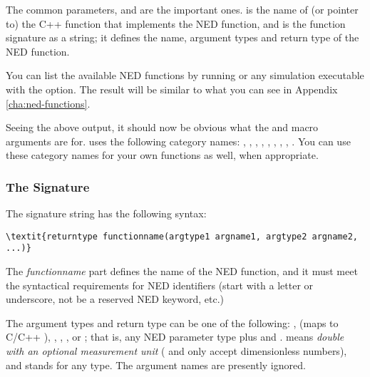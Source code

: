 The common parameters,  and  are the important
ones.  is the name of (or pointer to) the C++ function that
implements the NED function, and  is the function signature
as a string; it defines the name, argument types and return type of the NED
function.

You can list the available NED functions by running  or
any simulation executable with the  option.
The result will be similar to what you can see in Appendix
\ref{cha:ned-functions}.


Seeing the above output, it should now be obvious what the 
and  macro arguments are for. {\opp} uses the following
category names: , , ,
, , ,
, , . You can use these category names
for your own functions as well, when appropriate.


\subsubsection{The Signature}
\label{sec:sim-lib:ned-function-signature}

The signature string has the following syntax:

\begin{Verbatim}[commandchars=\\\{\}]
\textit{returntype functionname(argtype1 argname1, argtype2 argname2, ...)}
\end{Verbatim}

The \textit{functionname} part defines the name of the NED function, and it
must meet the syntactical requirements for NED identifiers (start with a
letter or underscore, not be a reserved NED keyword, etc.)

The argument types and return type can be one of the following:
,  (maps to C/C++ ),
, , , 
or ; that is, any NED parameter type plus 
and .  means \textit{double with an
optional measurement unit} ( and  only
accept dimensionless numbers), and  stands for any type. The
argument names are presently ignored.

